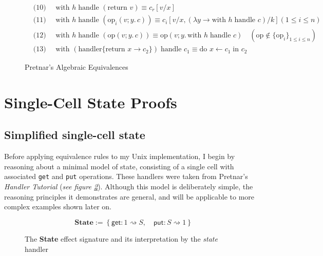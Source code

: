 \documentclass[logo,bsc,singlespacing,parskip]{infthesis}
\begin{document}
\begin{figure}[H]
\begin{tcolorbox}[colframe=black, colback=white, sharp corners]
    \begin{align*}
        &\text{(10) } \quad \text{with } h \; \text{handle } (\text{return } v) \equiv c_r[v/x] \\
        &\text{(11) } \quad \text{with } h \; \text{handle } (\text{op}_i(v; y.\, c)) \equiv c_i[v/x, (\lambda y \rightarrow \text{with } h \; \text{handle } c)/k]  (1 \leq i \leq n) \\
        &\text{(12) } \quad \text{with } h \; \text{handle } (\text{op}(v; y.\, c)) \equiv \text{op}(v; y.\, \text{with } h \; \text{handle } c) \quad (\text{op} \notin \{\text{op}_i\}_{1 \leq i \leq n}) \\
        &\text{(13) } \quad \text{with } (\text{handler} \{\text{return } x \rightarrow c_2\}) \; \text{handle } c_1 \equiv \text{do } x \leftarrow c_1 \; \text{in } c_2
    \end{align*}
    \end{tcolorbox}

    \caption{Pretnar's Algebraic Equivalences}
    \label{fig:equational-laws}
\end{figure}





\section{Single-Cell State Proofs}

\subsection{Simplified single-cell state}

\label{subsec:simplified-state}
Before applying equivalence rules to my Unix implementation, I begin by reasoning about a minimal model of state, consisting of a single cell with associated \lstinline{get} and \lstinline{put} operations. These handlers were taken from Pretnar's \textit{Handler Tutorial} \cite{pretnar_introduction_2015} (\textit{see figure \ref{fig:state-handler}}). Although this model is deliberately simple, the reasoning principles it demonstrates are general, and will be applicable to more complex examples shown later on.  

\begin{figure}[H]
\centering

\[
\textbf{State} := \left\{
\mathsf{get} : 1 \rightsquigarrow S, \quad
\mathsf{put} : S \rightsquigarrow 1
\right\}
\]


\caption{The \textbf{State} effect signature and its interpretation by the \textit{state} handler}
\label{fig:state-handler}
\end{figure}
\end{document}
